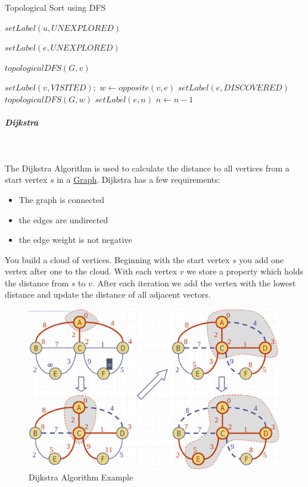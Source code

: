 \documentclass[11pt,twoside,twocolumn,landscape]{article}
\begin{document}
\begin{algorithm}
  \caption{Topological Sort using DFS}
  \begin{algorithmic}[1]
    \State $setLabel(u, UNEXPLORED)$
    \EndFor

    \State $setLabel(e, UNEXPLORED)$
    \EndFor

    \State $topologicalDFS(G, v)$
    \EndIf
    \EndFor
    \EndProcedure
  \end{algorithmic}
  \begin{algorithmic}[1]
    \State $setLabel(v, VISITED);$
    \State $w \gets opposite(v,e)$
    \State $setLabel(e, DISCOVERED)$
    \State $topologicalDFS(G, w)$
    \Else
    \State $setLabel(e, n)$
    \EndIf
    \EndIf
    \EndFor
    \State $n \gets n - 1$
    \EndProcedure
  \end{algorithmic}
\end{algorithm}

\subparagraph{Dijkstra} \
\label{sec:org1790411}

The Dijkstra Algorithm is used to calculate the distance to all vertices from a start vertex \(s\) in a \href{../../../roam/20220201163000-graph.org}{Graph}.
Dijkstra has a few requirements:
\begin{itemize}
\item The graph is connected
\item the edges are undirected
\item the edge weight is not negative
\end{itemize}


You build a cloud of vertices.
Beginning with the start vertex \(s\) you add one vertex after one to the cloud.
With each vertex \(v\) we store a property which holds the distance from \(s\) to \(v\).
After each iteration we add the vertex with the lowest distance and update the distance of all adjacent vectors.


\begin{figure}[htbp]
\centering
\includegraphics[width=.9\linewidth]{img/dijkstra_algorithm_example.png}
\caption{\label{fig:org6d44b1e}Dijkstra Algorithm Example}
\end{figure}
\end{document}
